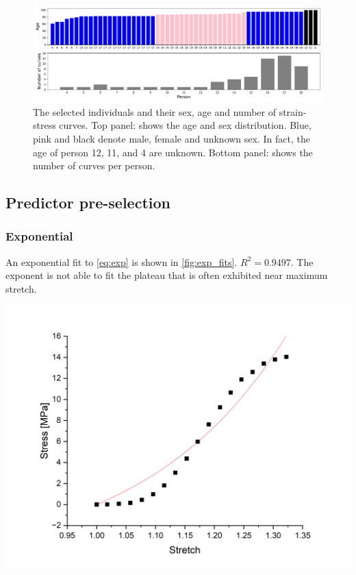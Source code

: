 \begin{figure}
    \centering
    \includegraphics[width=\linewidth]{skinstression/images/age_distribution.pdf}
    \caption[Source of data]{
        The selected individuals and their sex, age and number of strain-stress curves.
        Top panel: shows the age and sex distribution. Blue, pink and black denote male, female and unknown sex.
        In fact, the age of person 12, 11, and 4 are unknown.
        Bottom panel: shows the number of curves per person.
    }
    \label{fig:source_of_data}
\end{figure}

\subsection{Predictor pre-selection}
\subsubsection{Exponential}
An exponential fit to \cref{eq:exp} is shown in \cref{fig:exp_fits}.
$R^2 = \num{0.9497}$.
The exponent is not able to fit the plateau that is often exhibited near maximum stretch.

\begin{marginfigure}
    \centering
    \includegraphics[width=\linewidth]{skinstression/images/exp-fits/exponential.png}
    \caption[Exponential fit]{
        Exponential fit with \cref{eq:exp} (red) for one stress-strain curve (black).
        Fit parameters were $G_0=\qty{23.8\pm4.0}{\mega\pascal\per\stretch}$, and $\lambda=\qty{4.1\pm 1.0}{\stretch}$.
        $R^2=\num{0.9497}$.
    }
    \label{fig:exp_fits}
\end{marginfigure}

